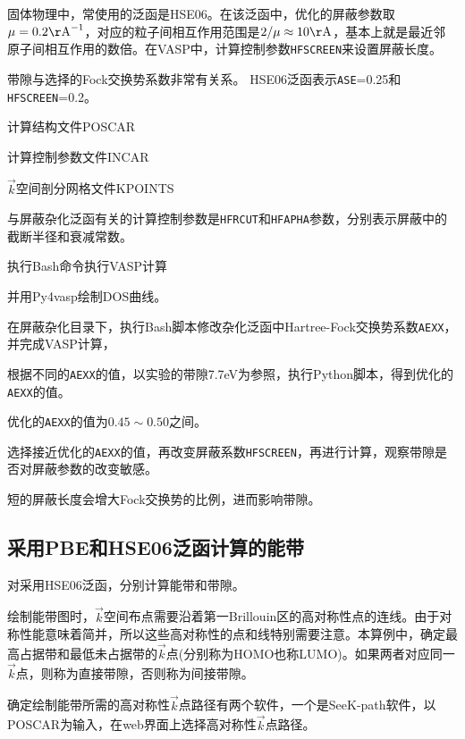 固体物理中，常使用的泛函是\textrm{HSE06}。在该泛函中，优化的屏蔽参数取$\mu=0.2\mathrm{\AA}^{-1}$，对应的粒子间相互作用范围是$2/\mu\approx10\mathrm{\AA}$，基本上就是最近邻原子间相互作用的数倍。在\textrm{VASP}中，计算控制参数\texttt{HFSCREEN}来设置屏蔽长度。

带隙与选择的\textrm{Fock}交换势系数非常有关系。%
\textrm{HSE06}泛函表示\texttt{ASE}=0.25和\texttt{HFSCREEN}=0.2。

计算结构文件\textrm{POSCAR}

计算控制参数文件\textrm{INCAR}

$\vec k$空间剖分网格文件\textrm{KPOINTS}

与屏蔽杂化泛函有关的计算控制参数是\texttt{HFRCUT}和\texttt{HFAPHA}参数，分别表示屏蔽中的截断半径和衰减常数。

执行\textrm{Bash}命令执行\textrm{VASP}计算

并用\textrm{Py4vasp}绘制\textrm{DOS}曲线。

在屏蔽杂化目录下，执行\textrm{Bash}脚本修改杂化泛函中\textrm{Hartree-Fock}交换势系数\texttt{AEXX}，并完成\textrm{VASP}计算，

根据不同的\texttt{AEXX}的值，以实验的带隙\textrm{7.7eV}为参照，执行\textrm{Python}脚本，得到优化的\texttt{AEXX}的值。

优化的\texttt{AEXX}的值为$0.45\sim0.50$之间。

选择接近优化的\texttt{AEXX}的值，再改变屏蔽系数\texttt{HFSCREEN}，再进行计算，观察带隙是否对屏蔽参数的改变敏感。

短的屏蔽长度会增大\textrm{Fock}交换势的比例，进而影响带隙。

\subsection{采用\rm{PBE}和\rm{HSE06}泛函计算的能带}
对采用\textrm{HSE06}泛函，分别计算能带和带隙。

绘制能带图时，$\vec k$空间布点需要沿着第一\textrm{Brillouin}区的高对称性点的连线。由于对称性能意味着简并，所以这些高对称性的点和线特别需要注意。本算例中，确定最高占据带和最低未占据带的$\vec k$点(分别称为\textrm{HOMO}也称\textrm{LUMO})。如果两者对应同一$\vec k$点，则称为直接带隙，否则称为间接带隙。

确定绘制能带所需的高对称性$\vec k$点路径有两个软件，一个是\textrm{SeeK-path}软件，以\textrm{POSCAR}为输入，在\textrm{web}界面上选择高对称性$\vec k$点路径。%

